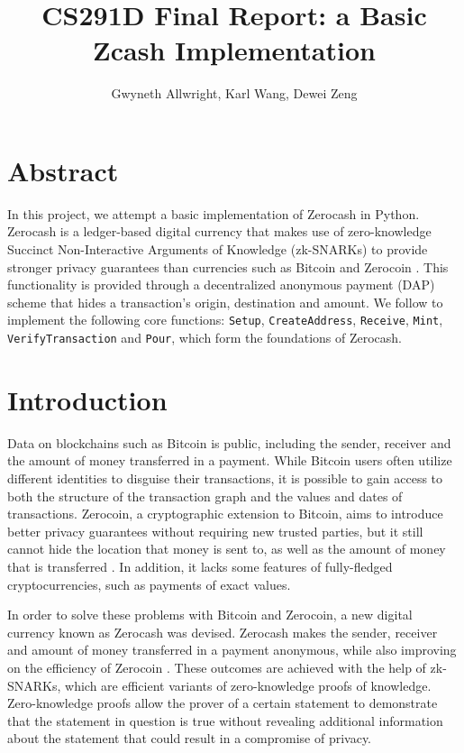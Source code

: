 \documentclass{article}
\begin{document}
\title{CS291D Final Report: a Basic Zcash Implementation}
\author{Gwyneth Allwright, Karl Wang, Dewei Zeng}

\maketitle

\section*{Abstract}
In this project, we attempt a basic implementation of Zerocash \cite{zerocash} in Python. Zerocash is a ledger-based digital currency that makes use of zero-knowledge Succinct Non-Interactive Arguments of Knowledge (zk-SNARKs) to provide stronger privacy guarantees than currencies such as Bitcoin \cite{bitcoin} and Zerocoin \cite{zerocoin}. This functionality is provided through a decentralized anonymous payment (DAP) scheme that hides a transaction's origin, destination and amount. We follow \cite{zerocash} to implement the following core functions: \texttt{Setup}, \texttt{CreateAddress}, \texttt{Receive}, \texttt{Mint}, \texttt{VerifyTransaction} and \texttt{Pour}, which form the foundations of Zerocash.

\tableofcontents

\newpage

\section{Introduction}
Data on blockchains such as Bitcoin is public, including the sender, receiver and the amount of money transferred in a payment. While Bitcoin users often utilize different identities to disguise their transactions, it is possible to gain access to both the structure of the transaction graph and the values and dates of transactions. Zerocoin, a cryptographic extension to Bitcoin, aims to introduce better privacy guarantees without requiring new trusted parties, but it still cannot hide the location that money is sent to, as well as the amount of money that is transferred \cite{zerocoin}. In addition, it lacks some features of fully-fledged cryptocurrencies, such as payments of exact values.

In order to solve these problems with Bitcoin and Zerocoin, a new digital currency known as Zerocash was devised. Zerocash makes the sender, receiver and amount of money transferred in a payment anonymous, while also improving on the efficiency of Zerocoin \cite{zerocash}. These outcomes are achieved with the help of zk-SNARKs, which are efficient variants of zero-knowledge proofs of knowledge. Zero-knowledge proofs allow the prover of a certain statement to demonstrate that the statement in question is true without revealing additional information about the statement that could result in a compromise of privacy.
\end{document}
